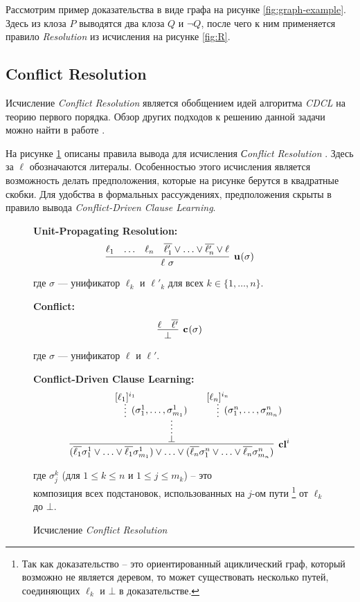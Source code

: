 \begin{example}
Рассмотрим пример доказательства в виде графа на рисунке \ref{fig:graph-example}. Здесь из клоза $P$ выводятся два клоза $Q$ и $\neg Q$, после чего к ним применяется правило \emph{Resolution} из исчисления на рисунке \ref{fig:R}.
\end{example}

\subsection{Conflict Resolution}
\label{sec:CR}
Исчисление \emph{Conflict Resolution} является обобщением идей алгоритма \emph{CDCL} на теорию первого порядка. Обзор других подходов к решению данной задачи можно найти в работе \cite{DBLP:journals/corr/SlaneyP16}.

На рисунке \ref{fig:CR} описаны правила вывода для исчисления \emph{Сonflict Resolution} \cite{DBLP:journals/corr/SlaneyP16}. Здесь за $\ell$ обозначаются литералы. Особенностью этого исчисления является возможность делать предположения, которые на рисунке берутся в квадратные скобки. Для удобства в формальных рассуждениях, предположения скрыты в правило вывода \emph{Conflict-Driven Clause Learning}.

\begin{figure}
\begin{calculus}
\centering
\textbf{Unit-Propagating Resolution:}
$$
\infer[\upr{}{\sigma}]
	  {\ell~\sigma}
      {\ell_1 & \ldots & \ell_n & \overline{\ell'_1} \vee \ldots \vee \overline{\ell'_n} \vee \ell}
$$

где $\sigma$ --- унификатор $\ell_k$ и $\ell'_k$ для всех $k \in \{1, \ldots, n \}$.

\bigskip

\textbf{Conflict:}
$$
\infer[\confl{}{\sigma}]
      {\bot}
      {\ell & \overline{\ell'}}
$$

где $\sigma$ --- унификатор $\ell$ и $\ell'$.

\bigskip

\textbf{Conflict-Driven Clause Learning:}
$$
\infer[\cdcl{}{i}]
      {(\overline{\ell_1} \sigma^1_1 \vee \ldots \vee \overline{\ell_1} \sigma^1_{m_1}) \vee \ldots \vee (\overline{\ell_n} \sigma^n_1 \vee \ldots \vee \overline{\ell_n} \sigma^n_{m_n})
      }
	  {\infer*{\bot}{\infer*[(\sigma_1^1,\ldots,\sigma_{m_1}^1)]{}{[\ell_1]^{\dls{i}{1}}} &  & \infer*[(\sigma_1^n,\ldots,\sigma_{m_n}^n)]{}{[\ell_n]^{\dls{i}{n}}}}
      }
$$

где $\sigma^k_j$ (для $1 \leq k \leq n$ и $1 \leq j \leq m_k$) -- это \\
композиция всех подстановок, использованных на $j$-ом пути \footnote{Так как
  доказательство -- это ориентированный ациклический граф, который возможно не
  является деревом, то может существовать несколько путей, соединяющих $\ell_k$ и
  $\bot$ в доказательстве.} от $\ell_k$ до $\bot$.

\end{calculus}
\caption{Исчисление \emph{Conflict Resolution}}
\label{fig:CR}
\end{figure}



